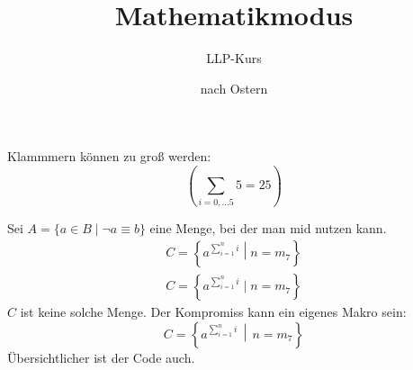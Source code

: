 \documentclass{scrartcl}
\title{Mathematikmodus}
\author{LLP-Kurs}
\date{nach Ostern}
\newcommand{\setDef}[2]{\left\{#1 
  \,\middle\vert\, #2\right\}}
\begin{document}
\maketitle
  Klammmern können zu groß werden:
  \begin{equation}
    \left(\sum_{i=0, \dots 5} 5 = 25\right)
  \end{equation}

  Sei $A = \{a \in B \mid \lnot a \equiv b\}$ eine Menge, bei der man mid nutzen kann.
  \begin{align}
    C = \left\{a^{\sum_{i = 1}^n i} \middle| n = m_7\right\} \\
    C = \left\{a^{\sum_{i = 1}^n i} \mid n = m_7\right\}
  \end{align}
  $C$ ist keine solche Menge. Der Kompromiss kann ein eigenes Makro sein:
  \begin{equation}
    C = \setDef{a^{\sum_{i = 1}^n i}}{n = m_7}
  \end{equation}
  Übersichtlicher ist der Code auch.
\end{document}
